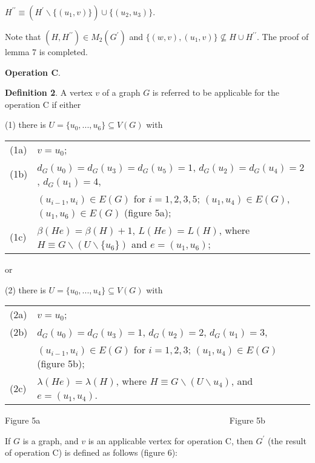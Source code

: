 \documentclass{article}
\begin{document}
\begin{center}
$H^{\prime \prime }\equiv (H^{\prime }\backslash \{(u_{1},v)\})\cup
\{(u_{2},u_{3})\}$.
\end{center}

Note that $(H,H^{\prime \prime })\in M_{2}(G^{\prime })$ and $\{(w,v),(u_{1},v)\}\nsubseteq H\cup H^{\prime \prime }$. The proof of lemma
7 is completed.

\bigskip

\textbf{Operation C}.

\textbf{Definition 2}. A vertex $v$ of a graph $G$ is referred to be
applicable for the operation C if either

(1) there is $U=\{u_{0},...,u_{6}\}\subseteq V(G)$ with

\qquad 
\begin{tabular}{ll}
(1a) & $v=u_{0}$; \\ 
(1b) & $d_{G}(u_{0})=d_{G}(u_{3})=d_{G}(u_{5})=1$, $d_{G}(u_{2})=d_{G}(u_{4})=2$, $d_{G}(u_{1})=4$, \\ 
& $(u_{i-1},u_{i})\in E(G)$ for $i=1,2,3,5$; $(u_{1},u_{4})\in E(G)$, $(u_{1},u_{6})\in E(G)$ (figure 5a); \\ 
(1c) & $\beta (He)=\beta (H)+1$, $L(He)=L(H)$, where $H\equiv G\backslash
(U\backslash \{u_{6}\})$ and $e=(u_{1},u_{6})$;\end{tabular}

or

(2) there is $U=\{u_{0},...,u_{4}\}\subseteq V(G)$ with

\qquad 
\begin{tabular}{ll}
(2a) & $v=u_{0}$; \\ 
(2b) & $d_{G}(u_{0})=d_{G}(u_{3})=1$, $d_{G}(u_{2})=2$, $d_{G}(u_{1})=3$, \\ 
& $(u_{i-1},u_{i})\in E(G)$ for $i=1,2,3$; $(u_{1},u_{4})\in E(G)$ (figure
5b); \\ 
(2c) & $\lambda (He)=\lambda (H)$, where $H\equiv G\backslash (U\backslash
u_{4})$, and $e=(u_{1},u_{4})$.\end{tabular}

\begin{center}

Figure 5a \ \ \ \ \ \ \ \ \ \ \ \ \ \ \ \ \ \ \ \ \ \ \ \ \ \ \ \ \ \ \ \ \
\ \ \ \ \ \ \ \ \ \ \ Figure 5b\bigskip
\end{center}

If $G$ is a graph, and $v$ is an applicable vertex for operation C, then $G^{\prime }$ (the result of operation C) is defined as follows (figure 6):
\end{document}
